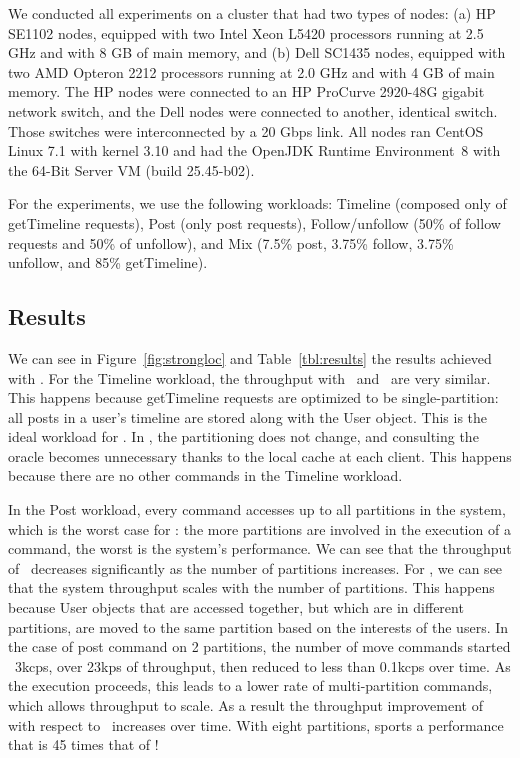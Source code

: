 We conducted all experiments on a cluster that had two types of nodes: (a) HP SE1102 nodes, equipped with two Intel Xeon L5420 processors running at 2.5 GHz and with 8 GB of main memory, and (b) Dell SC1435 nodes, equipped with two AMD Opteron 2212 processors running at 2.0 GHz and with 4 GB of main memory. The HP nodes were connected to an HP ProCurve 2920-48G gigabit network switch, and the Dell nodes were connected to another, identical switch. Those switches were interconnected by a 20 Gbps link.
All nodes ran CentOS Linux 7.1 with kernel 3.10 and had the OpenJDK Runtime Environment~8 with the \mbox{64-Bit} Server VM (build 25.45-b02).

For the experiments, we use the following workloads:
Timeline (composed only of getTimeline requests),
Post (only post requests),
Follow/unfollow (50\% of follow requests and 50\% of unfollow), and
Mix (7.5\% post, 3.75\% follow, 3.75\% unfollow, and 85\% getTimeline).

\subsection{Results }
\label{sec:evaluation:strongloc}


We can see in Figure~\ref{fig:strongloc} and Table~\ref{tbl:results} the results achieved with \appname{}.
For the Timeline workload, the throughput with \dssmr\ and \ssmr\ are very similar.
This happens because getTimeline requests are optimized to be single-partition:
all posts in a user's timeline are stored along with the User object.
This is the ideal workload for \ssmr{}.
In \dssmr{}, the partitioning does not change, and consulting the oracle becomes unnecessary thanks to the local cache at each client.
This happens because there are no other commands in the Timeline workload.

In the Post workload, every command accesses up to all partitions in the system, which is the worst case for \ssmr{}: the more partitions are involved in the execution of a command, the worst is the system's performance.
We can see that the throughput of \ssmr\ decreases significantly as the number of partitions increases.
For \dssmr{}, we can see that the system throughput scales with the number of partitions.
This happens because User objects that are accessed together, but which are in different partitions, are moved to the same partition based on the interests of the users.
In the case of post command on 2 partitions, the number of move commands started ~3kcps, over 23kps of throughput, then reduced to less than 0.1kcps over time.
As the execution proceeds, this leads to a lower rate of multi-partition commands, which allows throughput to scale.
As a result the throughput improvement of \dssmr{} with respect to \ssmr\ increases over time.
With eight partitions, \dssmr{} sports a performance that is 45 times that of \ssmr!

